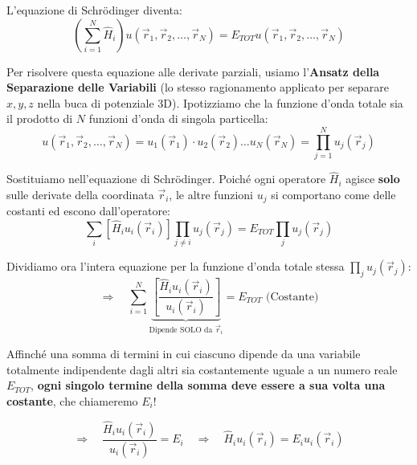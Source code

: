\documentclass[11pt, a4paper]{article}
\begin{document}
L'equazione di Schrödinger diventa: %
\begin{equation}
    \left( \sum_{i=1}^N \hat{H}_i \right) u(\vec{r}_1, \vec{r}_2, \dots, \vec{r}_N) = E_{TOT} u(\vec{r}_1, \vec{r}_2, \dots, \vec{r}_N) %
\end{equation}

\noindent
Per risolvere questa equazione alle derivate parziali, usiamo l'\textbf{Ansatz della Separazione delle Variabili} (lo stesso ragionamento applicato per separare $x, y, z$ nella buca di potenziale 3D). Ipotizziamo che la funzione d'onda totale sia il prodotto di $N$ funzioni d'onda di singola particella: %
\begin{equation*}
    u(\vec{r}_1, \vec{r}_2, \dots, \vec{r}_N) = u_1(\vec{r}_1) \cdot u_2(\vec{r}_2) \dots u_N(\vec{r}_N) = \prod_{j=1}^N u_j(\vec{r}_j) %
\end{equation*}

\noindent
Sostituiamo nell'equazione di Schrödinger. Poiché ogni operatore $\hat{H}_i$ agisce \textbf{solo} sulle derivate della coordinata $\vec{r}_i$, le altre funzioni $u_j$ si comportano come delle costanti ed escono dall'operatore: %
\begin{equation*}
    \sum_i \left[ \hat{H}_i u_i(\vec{r}_i) \right] \prod_{j \neq i} u_j(\vec{r}_j) = E_{TOT} \prod_j u_j(\vec{r}_j) %
\end{equation*}

Dividiamo ora l'intera equazione per la funzione d'onda totale stessa $\prod_j u_j(\vec{r}_j)$: %
\begin{equation}
    \Rightarrow \quad \sum_{i=1}^N \underbrace{ \left[ \frac{\hat{H}_i u_i(\vec{r}_i)}{u_i(\vec{r}_i)} \right] }_{\text{Dipende SOLO da } \vec{r}_i} = E_{TOT} \text{ (Costante)} %
\end{equation}

\noindent
Affinché una somma di termini in cui ciascuno dipende da una variabile totalmente indipendente dagli altri sia costantemente uguale a un numero reale $E_{TOT}$, \textbf{ogni singolo termine della somma deve essere a sua volta una costante}, che chiameremo $E_i$! %

\begin{equation}
    \Rightarrow \quad \frac{\hat{H}_i u_i(\vec{r}_i)}{u_i(\vec{r}_i)} = E_i \quad \Rightarrow \quad \boxed{ \hat{H}_i u_i(\vec{r}_i) = E_i u_i(\vec{r}_i) } %
\end{equation}
\end{document}
